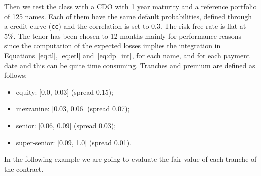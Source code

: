 Then we test the class with a CDO with 1 year maturity and a reference portfolio of 125 names. Each of them have the same default probabilities, defined through a credit curve (\texttt{cc}) and the correlation is set to 0.3. The risk free rate is flat at 5\%. The tenor has been chosen to 12 months mainly for performance reasons since the computation of the expected losses implies the integration in Equations~\ref{eq:tl}, \ref{eq:etl} and~\ref{eq:dp_int}, for each name, and for each payment date and this can be quite time consuming.
Tranches and premium are defined as follows:
\begin{itemize}
	\item equity: [0.0, 0.03] (spread 0.15);
	\item mezzanine: [0.03, 0.06] (spread 0.07);
	\item senior: [0.06, 0.09] (spread 0.03);
	\item super-senior: [0.09, 1.0] (spread 0.01).
\end{itemize}

In the following example we are going to evaluate the fair value of each tranche of the contract.

